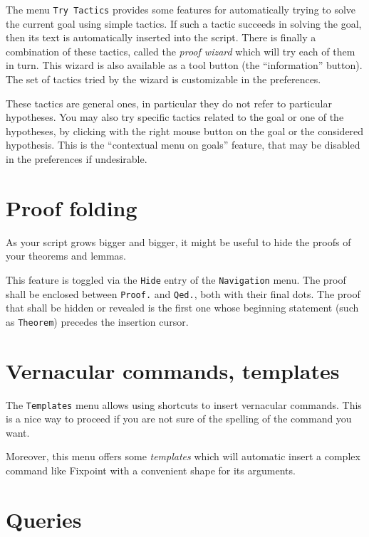 The menu \texttt{Try Tactics} provides some features for automatically
trying to solve the current goal using simple tactics. If such a
tactic succeeds in solving the goal, then its text is automatically
inserted into the script. There is finally a combination of these
tactics, called the \emph{proof wizard} which will try each of them in
turn. This wizard is also available as a tool button (the ``information''
button).  The set of tactics tried by the wizard is customizable in
the preferences.

These tactics are general ones, in particular they do not refer to
particular hypotheses. You may also try specific tactics related to
the goal or one of the hypotheses, by clicking with the right mouse
button on the goal or the considered hypothesis. This is the
``contextual menu on goals'' feature, that may be disabled in the
preferences if undesirable.

\section{Proof folding}

As your script grows bigger and bigger, it might be useful to hide the proofs
of your theorems and lemmas.

This feature is toggled via the \texttt{Hide} entry of the \texttt{Navigation}
menu. The proof shall be enclosed between \texttt{Proof.} and \texttt{Qed.},
both with their final dots. The proof that shall be hidden or revealed is the
first one whose beginning statement (such as \texttt{Theorem}) precedes the
insertion cursor.
 
\section{Vernacular commands, templates}

The \texttt{Templates} menu allows using shortcuts to insert
vernacular commands. This is a nice way to proceed if you are not sure
of the spelling of the command you want.

Moreover, this menu offers some \emph{templates} which will automatic
insert a complex command like Fixpoint with a convenient shape for its
arguments. 

\section{Queries}

